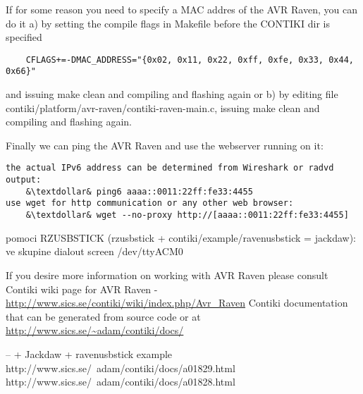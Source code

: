 \documentclass{article}
\begin{document}
If for some reason you need to specify a MAC addres of the AVR Raven, you can do it
a) by setting the compile flags in Makefile before the CONTIKI dir is specified
\begin{lstlisting}
	CFLAGS+=-DMAC_ADDRESS="{0x02, 0x11, 0x22, 0xff, 0xfe, 0x33, 0x44, 0x66}"
\end{lstlisting}
and issuing make clean and compiling and flashing again
or
b) by editing file contiki/platform/avr-raven/contiki-raven-main.c,
issuing make clean and compiling and flashing again.


Finally we can ping the AVR Raven and use the webserver running on it:
\begin{lstlisting}
the actual IPv6 address can be determined from Wireshark or radvd output:
	&\textdollar& ping6 aaaa::0011:22ff:fe33:4455
use wget for http communication or any other web browser:
	&\textdollar& wget --no-proxy http://[aaaa::0011:22ff:fe33:4455]     
\end{lstlisting}
 


pomoci RZUSBSTICK (rzusbstick + contiki/example/ravenusbstick = jackdaw):
ve skupine dialout
screen /dev/ttyACM0



If you desire more information on working with AVR Raven please consult
Contiki wiki page for AVR Raven - \url{http://www.sics.se/contiki/wiki/index.php/Avr_Raven}
Contiki documentation that can be generated from source code or at \url{http://www.sics.se/~adam/contiki/docs/}

-- + Jackdaw + ravenusbstick example
http://www.sics.se/~adam/contiki/docs/a01829.html
http://www.sics.se/~adam/contiki/docs/a01828.html
\end{document}
